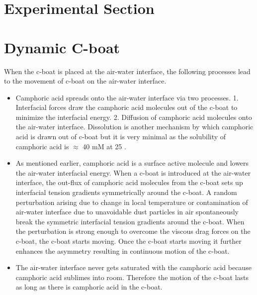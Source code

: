 \documentclass[aps, twocolumn, floatfix, superscriptaddress]{revtex4}
\begin{document}
\section{Experimental Section}

\section{Dynamic C-boat}
When the c-boat is placed at the air-water interface, the following processes lead to the movement of c-boat on the air-water interface.
\begin{itemize}
\item Camphoric acid spreads onto the air-water interface via two processes. 1. Interfacial forces draw the camphoric acid molecules out of the c-boat to minimize the interfacial energy. 2. Diffusion of camphoric acid molecules onto the air-water interface. Dissolution is another mechanism by which camphoric acid is drawn out of c-boat but it is very minimal as the solubility of camphoric acid is $\approx$ 40 mM at 25 \celsius.
\item As mentioned earlier, camphoric acid is a surface active molecule and lowers the air-water interfacial energy. When a c-boat is introduced at the air-water interface, the out-flux of camphoric acid molecules from the c-boat sets up interfacial tension gradients symmetrically around the c-boat. A random perturbation arising due to change in local temperature or contamination of air-water interface due to unavoidable dust particles in air spontaneously break the symmetric interfacial tension gradients around the c-boat. When the perturbation is strong enough to overcome the viscous drag forces on the c-boat, the c-boat starts moving. Once the c-boat starts moving it further enhances the asymmetry resulting in continuous motion of the c-boat.
\item The air-water interface never gets saturated with the camphoric acid because camphoric acid sublimes into room. Therefore the motion of the c-boat lasts as long as there is camphoric acid in the c-boat.
\end{itemize}
\end{document}
